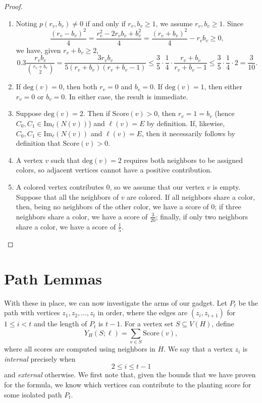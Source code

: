 \documentclass[11pt]{article}
\theoremstyle{plain}
\begin{document}
\begin{proof}
\text{ }
    \begin{enumerate}
        \item Noting $p(r_v, b_v)\neq0$ if and only if $r_v, b_v \geq 1$, we assume $r_v, b_v \geq 1$. Since 
        \[\frac{(r_v - b_v)^2}{4} = \frac{r_v^2 -2r_v b_v + b_v^2}{4} = \frac{(r_v + b_v)^2}{4}-r_v b_v \geq 0,\]
        we have, given $r_v + b_v \geq 2$, 
        \[0.3\frac{r_v b_v}{\binom{r_v + b_v}{2}} =\frac{3 r_v b_v}{5 (r_v + b_v) (r_v + b_v -1)} \leq \frac{3}{5} \cdot \frac{1}{4} \cdot \frac{r_v + b_v}{r_v + b_v-1} \leq \frac{3}{5} \cdot \frac{1}{4} \cdot {2} = \frac{3}{10}.\]
        \item If $\mathrm{deg}(v) = 0$, then both $r_v=0$ and $b_v =0$. If $\mathrm{deg}(v) = 1$, then either $r_v=0$ or $b_v=0$. In either case, the result is immediate. 
        \item Suppose $\mathrm{deg}(v)=2$. Then if $\mathrm{Score}(v)>0$, then $r_v = 1 = b_v$ (hence $C_0, C_1 \in \mathrm{Im}_\ell (N(v))$) and $\ell(v) = E$ by definition. If, likewise, $C_0, C_1 \in \mathrm{Im}_\ell (N(v))$ and $\ell(v) = E$, then it necessarily follows by definition that $\mathrm{Score}(v)>0$. 
        \item A vertex $v$ such that $\mathrm{deg}(v)=2$ requires both neighbors to be assigned colors, so adjacent vertices cannot have a positive contribution.
        \item A colored vertex contributes $0$, so we assume that our vertex $v$ is empty. Suppose that all the neighbors of $v$ are colored. If all neighbors share a color, then, being no neighbors of the other color, we have a score of $0$; if three neighbors share a color, we have a score of $\frac{3}{20}$; finally, if only two neighbors share a color, we have a score of $\frac{1}{5}$.
    \end{enumerate}
\end{proof}

\section{Path Lemmas} \label{sec:pathlem}

With these in place, we can now investigate the arms of our gadget. Let $P_t$ be the path with vertices $z_1, z_2, \dots, z_t$ in order, where the edges are $(z_i, z_{i+1})$ for $1 \leq i < t$ and the length of $P_t$ is $t-1$. For a vertex set $S\subseteq V(H)$, define
\[
Y_H(S;\ell)=\sum_{v\in S}\mathrm{Score}(v),
\]
where all scores are computed using neighbors in $H$. We say that a vertex $z_{i}$ is \emph{internal} precisely when
\[2 \leq i \leq t-1\]
and \emph{external} otherwise. We first note that, given the bounds that we have proven for the formula, we know which vertices can contribute to the planting score for some isolated path $P_t$.
\end{document}
